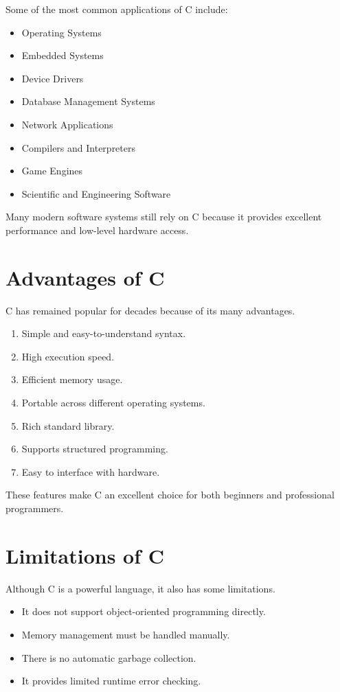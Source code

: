 \documentclass[12pt,openany]{book}
\begin{document}
Some of the most common applications of C include:

\begin{itemize}
    \item Operating Systems
    \item Embedded Systems
    \item Device Drivers
    \item Database Management Systems
    \item Network Applications
    \item Compilers and Interpreters
    \item Game Engines
    \item Scientific and Engineering Software
\end{itemize}

Many modern software systems still rely on C because it provides excellent performance and low-level hardware access.

\section{Advantages of C}

C has remained popular for decades because of its many advantages.

\begin{enumerate}
    \item Simple and easy-to-understand syntax.
    \item High execution speed.
    \item Efficient memory usage.
    \item Portable across different operating systems.
    \item Rich standard library.
    \item Supports structured programming.
    \item Easy to interface with hardware.
\end{enumerate}

These features make C an excellent choice for both beginners and professional programmers.

\section{Limitations of C}

Although C is a powerful language, it also has some limitations.

\begin{itemize}
    \item It does not support object-oriented programming directly.
    \item Memory management must be handled manually.
    \item There is no automatic garbage collection.
    \item It provides limited runtime error checking.
\end{itemize}
\end{document}
